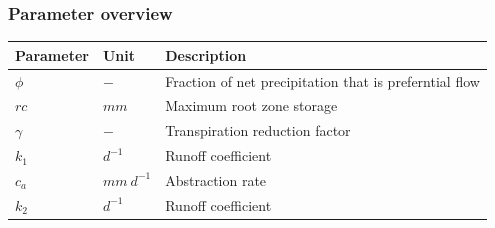 \newpage
\subsubsection{Parameter overview}
\begin{table}[htbp]
  \centering
    \begin{tabular}{lll}
    \toprule
    Parameter & Unit  & Description \\
    \midrule
    $\phi$ & $-$   & Fraction of net precipitation that is preferntial flow \\
    $rc$  & $mm$  & Maximum root zone storage \\
    $\gamma$ & $-$   & Transpiration reduction factor \\
    $k_1$ & $d^{-1}$ & Runoff coefficient \\
    $c_a$ & $mm~d^{-1}$ & Abstraction rate \\
    $k_2$ & $d^{-1}$ & Runoff coefficient \\
    \bottomrule
    \end{tabular}%
  \label{tab:addlabel}%
\end{table}%

